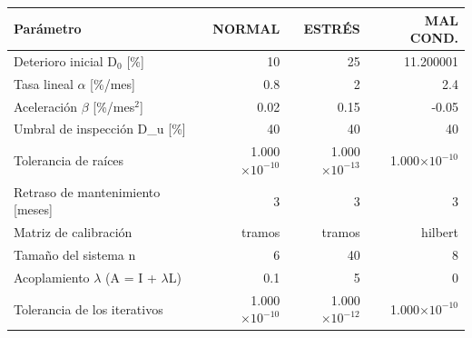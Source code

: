 {\footnotesize
\begin{longtable}{lrrr}
\toprule
\textbf{Parámetro} & \textbf{NORMAL} & \textbf{ESTRÉS} & \textbf{MAL COND.} \\
\midrule
\endhead
Deterioro inicial D$_{0}$ [\%] & 10 & 25 & 11.200001 \\
Tasa lineal $\alpha$ [\%/mes] & 0.8 & 2 & 2.4 \\
Aceleración $\beta$ [\%/mes$^{2}$] & 0.02 & 0.15 & -0.05 \\
Umbral de inspección D\_u [\%] & 40 & 40 & 40 \\
Tolerancia de raíces & 1.000$\times10^{-10}$ & 1.000$\times10^{-13}$ & 1.000$\times10^{-10}$ \\
Retraso de mantenimiento [meses] & 3 & 3 & 3 \\
Matriz de calibración & tramos & tramos & hilbert \\
Tamaño del sistema n & 6 & 40 & 8 \\
Acoplamiento $\lambda$ (A = I + $\lambda$L) & 0.1 & 5 & 0 \\
Tolerancia de los iterativos & 1.000$\times10^{-10}$ & 1.000$\times10^{-12}$ & 1.000$\times10^{-10}$ \\
\bottomrule
\end{longtable}
}
